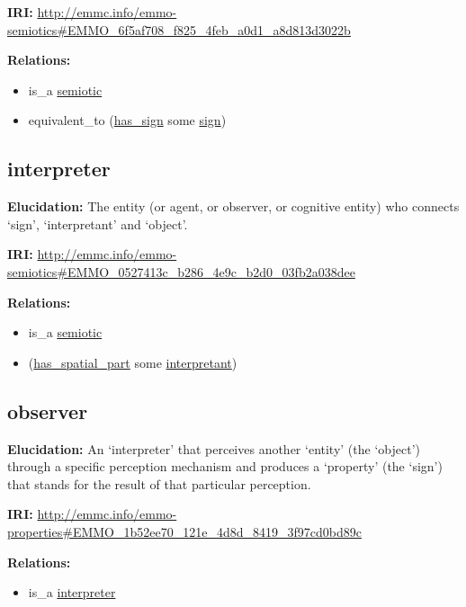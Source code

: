 \documentclass[a4paper,]{report}
\providecommand{\tightlist}{%
  \setlength{\itemsep}{0pt}\setlength{\parskip}{0pt}}
\begin{document}
\textbf{IRI:}
\url{http://emmc.info/emmo-semiotics\#EMMO_6f5af708_f825_4feb_a0d1_a8d813d3022b}

\textbf{Relations:}

\begin{itemize}
\tightlist
\item
  is\_a \protect\hyperlink{semiotic}{semiotic}
\item
  equivalent\_to (\protect\hyperlink{has_sign}{has\_sign} some
  \protect\hyperlink{sign}{sign})
\end{itemize}

\hypertarget{interpreter}{%
\subsection{interpreter}\label{interpreter}}

\textbf{Elucidation:} The entity (or agent, or observer, or cognitive
entity) who connects `sign', `interpretant' and `object'.

\textbf{IRI:}
\url{http://emmc.info/emmo-semiotics\#EMMO_0527413c_b286_4e9c_b2d0_03fb2a038dee}

\textbf{Relations:}

\begin{itemize}
\tightlist
\item
  is\_a \protect\hyperlink{semiotic}{semiotic}
\item
  (\protect\hyperlink{has_spatial_part}{has\_spatial\_part} some
  \protect\hyperlink{interpretant}{interpretant})
\end{itemize}

\hypertarget{observer}{%
\subsection{observer}\label{observer}}

\textbf{Elucidation:} An `interpreter' that perceives another `entity'
(the `object') through a specific perception mechanism and produces a
`property' (the `sign') that stands for the result of that particular
perception.

\textbf{IRI:}
\url{http://emmc.info/emmo-properties\#EMMO_1b52ee70_121e_4d8d_8419_3f97cd0bd89c}

\textbf{Relations:}

\begin{itemize}
\tightlist
\item
  is\_a \protect\hyperlink{interpreter}{interpreter}
\end{itemize}
\end{document}
